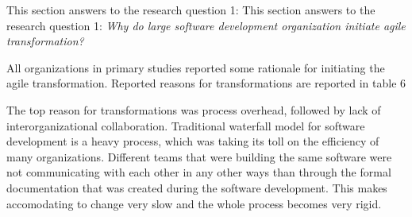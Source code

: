 This section answers to the research question 1: This section answers
to the research question 1: \textit{Why do large software development
organization initiate agile transformation?}

All organizations in primary studies reported some rationale
for initiating the agile transformation. Reported reasons for
transformations are reported in table 6

\bigbreak

\bigbreak

The top reason for transformations was process overhead, followed by
lack of interorganizational collaboration. Traditional waterfall model
for software development is a heavy process, which was taking its toll
on the efficiency of many organizations. Different teams that were
building the same software were not communicating with each other in any
other ways than through the formal documentation that was created during
the software development. This makes accomodating to change very slow
and the whole process becomes very rigid.
